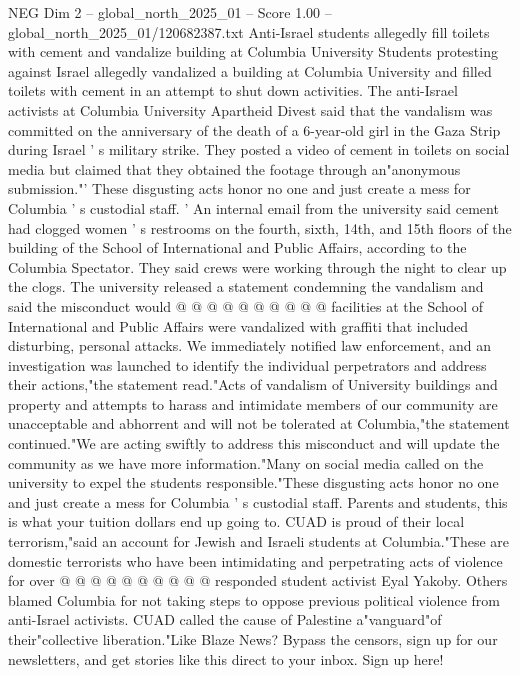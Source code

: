 \begin{textsample}{NEG Dim 2 – global\_north\_2025\_01 – Score 1.00 – global\_north\_2025\_01/120682387.txt}  \label{ex:f2_neg_085}
Anti-Israel students allegedly fill toilets with cement and vandalize building at Columbia University Students protesting against Israel allegedly vandalized a building at Columbia University and filled toilets with cement in an attempt to shut down activities.
The anti-Israel activists at Columbia University Apartheid Divest said that the vandalism was committed on the anniversary of the death of a 6-year-old girl in the Gaza Strip during Israel ' s military strike.
They posted a video of cement in toilets on social media but claimed that they obtained the footage through an"anonymous submission."' These disgusting acts honor no one and just create a mess for Columbia ' s custodial staff. ' An internal email from the university said cement had clogged women ' s restrooms on the fourth, sixth, 14th, and 15th floors of the building of the School of International and Public Affairs, according to the Columbia Spectator.
They said crews were working through the night to clear up the clogs.
The university released a statement condemning the vandalism and said the misconduct would @ @ @ @ @ @ @ @ @ @ facilities at the School of International and Public Affairs were vandalized with graffiti that included disturbing, personal attacks.
We immediately notified law enforcement, and an investigation was launched to identify the individual perpetrators and address their actions,"the statement read."Acts of vandalism of University buildings and property and attempts to harass and intimidate members of our community are unacceptable and abhorrent and will not be tolerated at Columbia,"the statement continued."We are acting swiftly to address this misconduct and will update the community as we have more information."Many on social media called on the university to expel the students responsible."These disgusting acts honor no one and just create a mess for Columbia ' s custodial staff.
Parents and students, this is what your tuition dollars end up going to.
CUAD is proud of their local terrorism,"said an account for Jewish and Israeli students at Columbia."These are domestic terrorists who have been intimidating and perpetrating acts of violence for over @ @ @ @ @ @ @ @ @ @ responded student activist Eyal Yakoby.
Others blamed Columbia for not taking steps to oppose previous political violence from anti-Israel activists.
CUAD called the cause of Palestine a"vanguard"of their"collective liberation."Like Blaze News?
Bypass the censors, sign up for our newsletters, and get stories like this direct to your inbox.
Sign up here!

\end{textsample}
